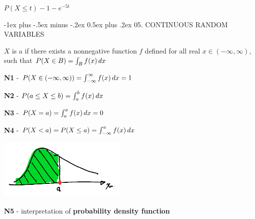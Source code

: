 \documentclass[10pt, landscape]{article}
\makeatletter
\renewcommand{\section}{\@startsection{section}{1}{0mm}%
  {-1ex plus -.5ex minus -.2ex}%
  {0.5ex plus .2ex}%
{\normalfont\large\bfseries}}
\makeatother
\begin{document}
\begin{multicols*}{3}
\begin{niceproof}[A]
    $P(X \leq t) - 1-e^{-5t}$
  \end{niceproof}


  \section{05. CONTINUOUS RANDOM VARIABLES}

  $X$ is a  if there exists a nonnegative function $f$ defined for all real $x \in (-\infty, \infty)$, 
  such that $P(X \in B) = \int_B f(x) \mathop{dx}$ 

  \begin{minipage}[c]{0.6\linewidth}
    \textbf{N1} - $P(X \in (-\infty, \infty)) = \int^\infty_{-\infty} f(x) \mathop{dx} = 1 $

    \textbf{N2} - $P(a \leq X \leq b) = \int^b_a f(x) \mathop{dx}$

    \textbf{N3} - $P(X=a) = \int^a_a f(x) \mathop{dx} = 0$

    \textbf{N4} - $P(X < a) = P(X \leq a) = \int^a_{-\infty} f(x) \mathop{dx}$
  \end{minipage}
  \begin{minipage}[c]{0.35\linewidth}
    \includegraphics[width=0.9\linewidth]{st2131-continuous-rv-fx.png} 
  \end{minipage}

  \textbf{N5} - interpretation of \textbf{probability density function} 


\end{multicols*}
\end{document}
